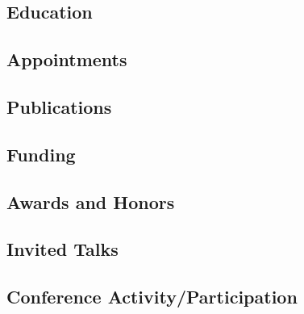 \documentclass[11pt,subeqn]{article}
\begin{document}
\begin{center}

\end{center}

\subsection*{Education}


\subsection*{Appointments}


\subsection*{Publications}


\subsection*{Funding}


\subsection*{Awards and Honors}


\subsection*{Invited Talks}


\subsection*{Conference Activity/Participation}


%









%
\end{document}
